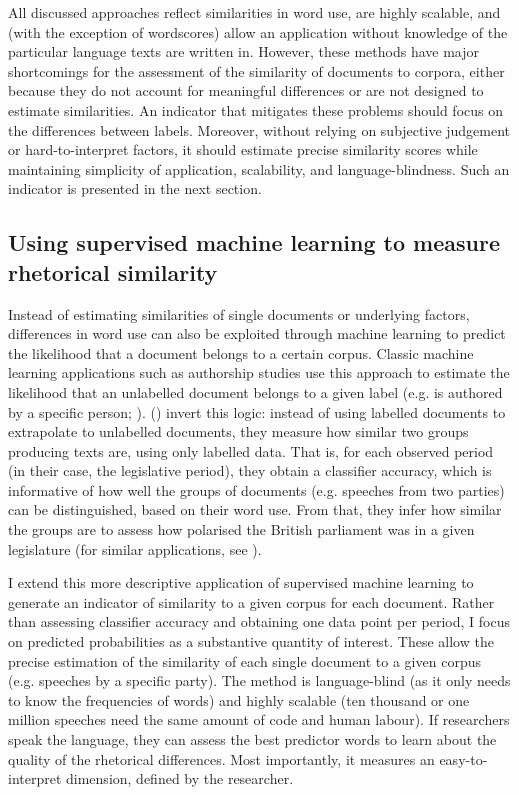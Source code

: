 \documentclass{article}
\begin{document}
All discussed approaches reflect similarities in word use, are highly scalable, and (with the exception of wordscores) allow an application without knowledge of the particular language texts are written in. However, these methods have major shortcomings for the assessment of the similarity of documents to corpora, either because they do not account for meaningful differences or are not designed to estimate similarities. An indicator that mitigates these problems should focus on the differences between labels. Moreover, without relying on subjective judgement or hard-to-interpret factors, it should estimate precise similarity scores while maintaining simplicity of application, scalability, and language-blindness. Such an indicator is presented in the next section.\par

\subsection{Using supervised machine learning to measure rhetorical similarity}
\label{sec:method}

Instead of estimating similarities of single documents or underlying factors, differences in word use can also be exploited through machine learning to predict the likelihood that a document belongs to a certain corpus. Classic machine learning applications such as authorship studies use this approach to estimate the likelihood that an unlabelled document belongs to a given label (e.g. is authored by a specific person; \cite{Mosteller1963}). \citeauthor{Peterson2018} (\citeyear{Peterson2018}) invert this logic: instead of using labelled documents to extrapolate to unlabelled documents, they measure how similar two groups producing texts are, using only labelled data. That is, for each observed period (in their case, the legislative period), they obtain a classifier accuracy, which is informative of how well the groups of documents (e.g. speeches from two parties) can be distinguished, based on their word use. From that, they infer how similar the groups are to assess how polarised the British parliament was in a given legislature (for similar applications, see \cite{Gentzkow2019, Goet2019}).\par 

I extend this more descriptive application of supervised machine learning to generate an indicator of similarity to a given corpus for each document. Rather than assessing classifier accuracy and obtaining one data point per period, I focus on predicted probabilities as a substantive quantity of interest. These allow the precise estimation of the similarity of each single document to a given corpus (e.g. speeches by a specific party). The method is language-blind (as it only needs to know the frequencies of words) and highly scalable (ten thousand or one million speeches need the same amount of code and human labour). If researchers speak the language, they can assess the best predictor words to learn about the quality of the rhetorical differences. Most importantly, it measures an easy-to-interpret dimension, defined by the researcher. \par
\end{document}
